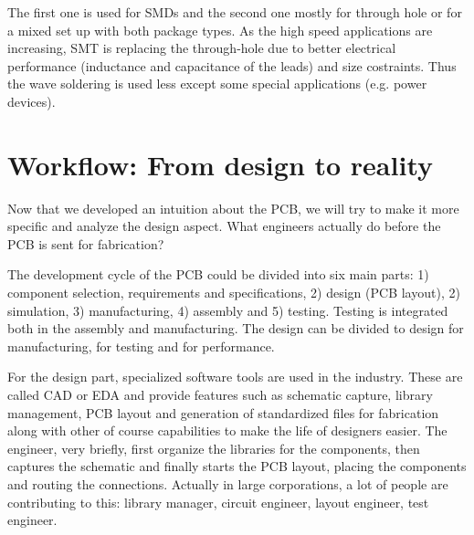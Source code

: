 \documentclass[12pt]{article}
\begin{document}

The first one is used for SMDs and the second one mostly for through hole or for a mixed set up with both package types. 
As the high speed applications are increasing, SMT is replacing the through-hole due to better electrical performance (inductance and capacitance of the leads) and size costraints. Thus the wave soldering is used less except some special applications (e.g. power devices).







\section{Workflow: From design to reality} 

Now that we developed an intuition about the PCB, we will try to make it more specific and analyze the design aspect. What engineers actually do before the PCB is sent for fabrication?

The development cycle of the PCB could be divided into six main parts: 1) component selection, requirements and specifications, 2) design (PCB layout), 2) simulation, 3) manufacturing, 4) assembly and 5) testing. Testing is integrated both in the assembly and manufacturing.
The design can be divided to design for manufacturing, for testing and for performance.  

For the design part, specialized software tools are used in the industry. These are called CAD or EDA and provide features such as schematic capture, library management, PCB layout and generation of standardized files for fabrication along with other of course capabilities to make the life of designers easier. The engineer, very briefly, first organize the libraries for the components, then captures the schematic and finally starts the PCB layout, placing the components and routing the connections. Actually in large corporations, a lot of people are contributing to this: library manager, circuit engineer, layout engineer, test engineer.
\end{document}
